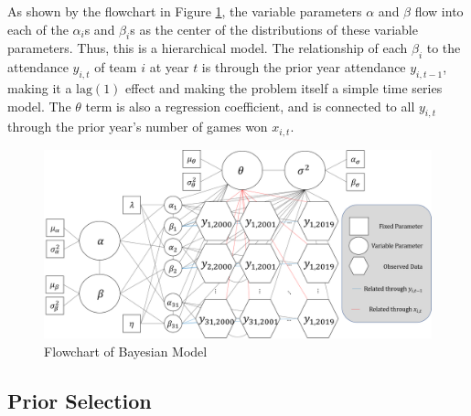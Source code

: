 \documentclass[11pt]{article}
\begin{document}
As shown by the flowchart in Figure \ref{fig:flowchart}, the variable parameters $\alpha$ and $\beta$ flow into each of the $\alpha_i$s and $\beta_i$s as the center of the distributions of these variable parameters. Thus, this is a hierarchical model. The relationship of each $\beta_i$ to the attendance $y_{i,t}$ of team $i$ at year $t$ is through the prior year attendance $y_{i,t-1}$, making it a $\text{lag}(1)$ effect and making the problem itself a simple time series model. The $\theta$ term is also a regression coefficient, and is connected to all $y_{i,t}$ through the prior year's number of games won $x_{i,t}$.

\begin{figure}
    \centering
    \includegraphics[width=.7\textwidth]{flowchart.png}
    \caption{\footnotesize Flowchart of Bayesian Model \vspace*{-.5\baselineskip}}
    \label{fig:flowchart}
\end{figure}

\vspace*{-.5\baselineskip}
\subsection{Prior Selection}
\end{document}
